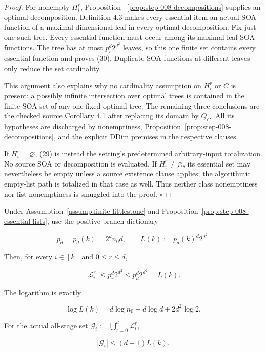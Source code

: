 \begin{proof}
For nonempty \(H_i^r\), Proposition
~\ref{prop:step-008-decompositions} supplies an optimal decomposition.
Definition 4.3 makes every essential item an actual SOA function of a
maximal-dimensional leaf in every optimal decomposition. Fix just one such
tree. Every essential function must occur among its maximal-leaf SOA
functions. The tree has at most \(p_r^d2^{d^2}\) leaves, so this one finite
set contains every essential function and proves (30). Duplicate SOA
functions at different leaves only reduce the set cardinality.

This argument also explains why no cardinality assumption on \(H_i^r\) or
\(\bar C\) is present: a possibly infinite intersection over optimal trees
is contained in the finite SOA set of any one fixed optimal tree. The
remaining three conclusions are the checked source Corollary 4.1 after
replacing its domain by \(Q_C\). All its hypotheses are discharged by
nonemptiness, Proposition~\ref{prop:step-008-decompositions}, and the
explicit DDim premises in the respective clauses.

If \(H_i^r=\varnothing\), (29) is instead the setting's predetermined
arbitrary-input totalization. No source SOA or decomposition is evaluated.
If \(H_i^r\ne\varnothing\), its essential set may nevertheless be empty
unless a source existence clause applies; the algorithmic empty-list path
is totalized in that case as well. Thus neither class nonemptiness nor list
nonemptiness is smuggled into the proof. \(\square\)


\end{proof}

\begin{proposition}\label{prop:step-008-list-envelope}
Under Assumption~\ref{assump:finite-littlestone} and
Proposition~\ref{prop:step-008-essential-lists}, use the 
positive-branch dictionary

\[
 p_d=p_d(k)=2^dn_0d,\qquad
 L(k):=p_d(k)^d2^{d^2}.
\tag{31}
\]

Then, for every \(i\in[k]\) and \(0\le r\le d\),

\[
 |\mathcal L_i^r|
 \le p_r^d2^{d^2}
 \le p_d^d2^{d^2}
 =L(k).
\tag{32}
\]

The logarithm is exactly

\[
 \log L(k)
 =d\log n_0+d\log d+2d^2\log2.
\tag{33}
\]

For the actual all-stage set
\(\mathcal G_i:=\bigcup_{r=0}^d\mathcal L_i^r\),

\[
 |\mathcal G_i|\le(d+1)L(k).
\tag{34}
\]


\end{proposition}

